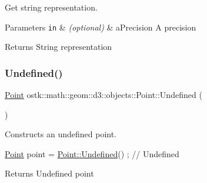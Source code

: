 Get string representation. 


\begin{DoxyParams}[1]{Parameters}
\mbox{\tt in}  & {\em (optional)} & a\+Precision A precision \\
\hline
\end{DoxyParams}
\begin{DoxyReturn}{Returns}
String representation 
\end{DoxyReturn}
\mbox{\label{classostk_1_1math_1_1geom_1_1d3_1_1objects_1_1_point_ab0de3c7a7d547bbf169d0beb62f9ea25}} 
\subsubsection{\texorpdfstring{Undefined()}{Undefined()}}
{\footnotesize\ttfamily \hyperlink{classostk_1_1math_1_1geom_1_1d3_1_1objects_1_1_point}{Point} ostk\+::math\+::geom\+::d3\+::objects\+::\+Point\+::\+Undefined (\begin{DoxyParamCaption}{ }\end{DoxyParamCaption})\hspace{0.3cm}{\ttfamily [static]}}



Constructs an undefined point. 


\begin{DoxyCode}
\hyperlink{classostk_1_1math_1_1geom_1_1d3_1_1objects_1_1_point_ad9bee5dadb878200f859b20a34680ae5}{Point} point = \hyperlink{classostk_1_1math_1_1geom_1_1d3_1_1objects_1_1_point_ab0de3c7a7d547bbf169d0beb62f9ea25}{Point::Undefined}() ; \textcolor{comment}{// Undefined}
\end{DoxyCode}


\begin{DoxyReturn}{Returns}
Undefined point 
\end{DoxyReturn}
\mbox{\label{classostk_1_1math_1_1geom_1_1d3_1_1objects_1_1_point_a74796fec8c39081bc8d766d70e44651d}} 

